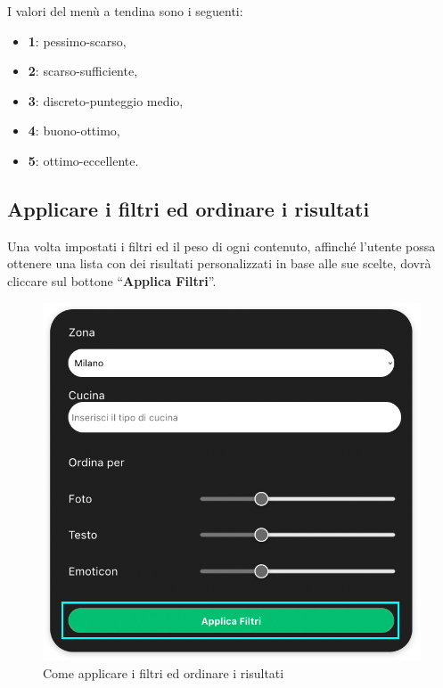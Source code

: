 I valori del menù a tendina sono i seguenti:

\begin{itemize}
\item \textbf{1}: pessimo-scarso,
\item \textbf{2}: scarso-sufficiente,
\item \textbf{3}: discreto-punteggio medio,
\item \textbf{4}: buono-ottimo,
\item \textbf{5}: ottimo-eccellente.
\end{itemize}

\subsection{Applicare i filtri ed ordinare i risultati}

Una volta impostati i filtri ed il peso di ogni contenuto, affinché l’utente possa ottenere una lista con dei risultati personalizzati in base alle sue scelte, dovrà cliccare sul bottone “\textbf{Applica Filtri}”.

\begin{figure}[H]
\centering
\includegraphics[scale=0.3]{./images/Ricerca/ApplicaFiltri.png} 
\caption{Come applicare i filtri ed ordinare i risultati}
\end{figure}
